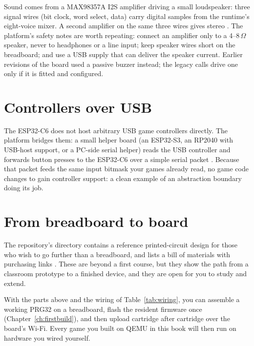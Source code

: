 Sound comes from a MAX98357A I2S amplifier driving a small loudspeaker: three
signal wires (bit clock, word select, data) carry digital samples from the
runtime's eight-voice mixer. A second amplifier on the same three wires gives
stereo \citep{prg32hardware}. The platform's safety notes are worth repeating:
connect an amplifier only to a 4--8\,$\Omega$ speaker, never to headphones or a
line input; keep speaker wires short on the breadboard; and use a USB supply
that can deliver the speaker current. Earlier revisions of the board used a
passive buzzer instead; the legacy  calls drive one only
if it is fitted and configured.

\section{Controllers over USB}

The ESP32\nobreakdash-C6 does not host arbitrary USB game controllers directly. The platform
bridges them: a small helper board (an ESP32\nobreakdash-S3, an RP2040 with USB-host support,
or a PC-side serial helper) reads the USB controller and forwards button presses
to the ESP32\nobreakdash-C6 over a simple serial packet \citep{prg32repo}. Because that packet
feeds the same input bitmask your games already read, no game code changes to gain
controller support: a clean example of an abstraction boundary doing its job.

\section{From breadboard to board}

The repository's  directory contains a reference printed-circuit
design for those who wish to go further than a breadboard, and
 lists a bill of materials with purchasing links
\citep{prg32repo}. These are beyond a first course, but they show the path from a
classroom prototype to a finished device, and they are open for you to study and
extend.

\begin{prgcheck}
With the parts above and the wiring of Table~\ref{tab:wiring}, you can assemble a
working PRG32 on a breadboard, flash the resident firmware once
(Chapter~\ref{ch:firstbuild}), and then upload cartridge after cartridge over the
board's Wi-Fi. Every game you built on QEMU in this book will then run on hardware
you wired yourself.
\end{prgcheck}
